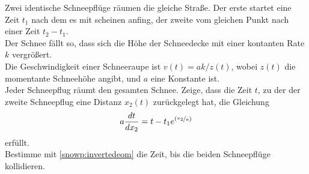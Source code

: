 \begin{Exercise}[label = snowploughing, title = Schneepflug, origin = {STEP 1987, Paper 3}, difficulty = 4]
	Zwei identische Schneepflüge räumen die gleiche Straße. Der erste startet eine Zeit $t_1$ nach dem es mit scheinen anfing, der zweite vom gleichen Punkt nach einer Zeit $t_2-t_1$.\\
	Der Schnee fällt so, dass sich die Höhe der Schneedecke mit einer kontanten Rate $k$ vergrößert.\\
	Die Geschwindigkeit einer Schneeraupe ist $v\left(t\right) = a k/z\left(t\right)$, wobei $z\left(t\right)$ die momentante Schneehöhe angibt, und $a$ eine Konstante ist.\\
	Jeder Schneepflug räumt den gesamten Schnee. Zeige, dass die Zeit $t$, zu der der zweite Schneepflug eine Distanz $x_2\left(t\right)$ zurückgelegt hat, die Gleichung
	\begin{equation}\label{snowp:invertedeom}
		a \frac{dt}{dx_2} = t - t_1e^{\left(\nicefrac{x_2}{a}\right)}
	\end{equation}
	erfüllt.\\
	Bestimme mit \eqref{snowp:invertedeom} die Zeit, bis die beiden Schneepflüge kollidieren.
\end{Exercise}